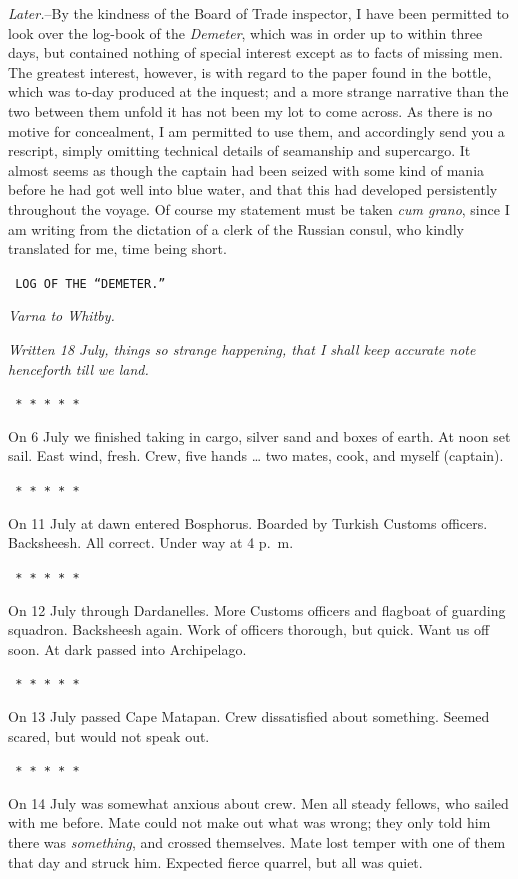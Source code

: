 \documentclass[12pt,openright]{book}
\begin{document}
\textit{Later.}–By the kindness of the Board of Trade inspector, I have been permitted to look over the log-book of the \textit{Demeter}, which was in order up to within three days, but contained nothing of special interest except as to facts of missing men. The greatest interest, however, is with regard to the paper found in the bottle, which was to-day produced at the inquest; and a more strange narrative than the two between them unfold it has not been my lot to come across. As there is no motive for concealment, I am permitted to use them, and accordingly send you a rescript, simply omitting technical details of seamanship and supercargo. It almost seems as though the captain had been seized with some kind of mania before he had got well into blue water, and that this had developed persistently throughout the voyage. Of course my statement must be taken \textit{cum grano}, since I am writing from the dictation of a clerk of the Russian consul, who kindly translated for me, time being short.

\texttt{                     LOG OF THE “DEMETER.”}

\textit{Varna to Whitby.}

\textit{Written 18 July, things so strange happening, that I shall keep}\textit{ }\textit{accurate note henceforth till we land.}

\texttt{   *       *       *       *       *}

On 6 July we finished taking in cargo, silver sand and boxes of earth. At noon set sail. East wind, fresh. Crew, five hands … two mates, cook, and myself (captain).

\texttt{   *       *       *       *       *}

On 11 July at dawn entered Bosphorus. Boarded by Turkish Customs officers. Backsheesh. All correct. Under way at 4 p. m.

\texttt{   *       *       *       *       *}

On 12 July through Dardanelles. More Customs officers and flagboat of guarding squadron. Backsheesh again. Work of officers thorough, but quick. Want us off soon. At dark passed into Archipelago.

\texttt{   *       *       *       *       *}

On 13 July passed Cape Matapan. Crew dissatisfied about something. Seemed scared, but would not speak out.

\texttt{   *       *       *       *       *}

On 14 July was somewhat anxious about crew. Men all steady fellows, who sailed with me before. Mate could not make out what was wrong; they only told him there was \textit{something}, and crossed themselves. Mate lost temper with one of them that day and struck him. Expected fierce quarrel, but all was quiet.
\end{document}
